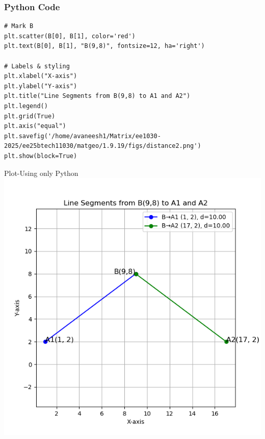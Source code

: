 \documentclass{beamer}
\begin{document}
\begin{frame}[fragile]
    \frametitle{Python Code }
    \begin{lstlisting}
# Mark B
plt.scatter(B[0], B[1], color='red')
plt.text(B[0], B[1], "B(9,8)", fontsize=12, ha='right')

# Labels & styling
plt.xlabel("X-axis")
plt.ylabel("Y-axis")
plt.title("Line Segments from B(9,8) to A1 and A2")
plt.legend()
plt.grid(True)
plt.axis("equal")
plt.savefig('/home/avaneesh1/Matrix/ee1030-2025/ee25btech11030/matgeo/1.9.19/figs/distance2.png')
plt.show(block=True)

\end{lstlisting}
\end{frame}




\begin{frame}{Plot-Using only Python}
    \centering
    \includegraphics[width=\columnwidth, height=0.8\textheight, keepaspectratio]{figs/distance2.png}     
\end{frame}
\end{document}

